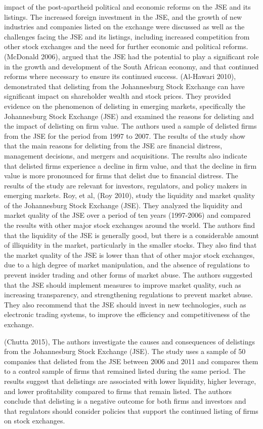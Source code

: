 \documentclass[
]{article}
\begin{document}
impact of the post-apartheid political and economic reforms on the JSE
and its listings. The increased foreign investment in the JSE, and the
growth of new industries and companies listed on the exchange were
discussed as well as the challenges facing the JSE and its listings,
including increased competition from other stock exchanges and the need
for further economic and political reforms. (McDonald 2006), argued that
the JSE had the potential to play a significant role in the growth and
development of the South African economy, and that continued reforms
where necessary to ensure its continued success. (Al-Hawari 2010),
demonstrated that delisting from the Johannesburg Stock Exchange can
have significant impact on shareholder wealth and stock prices. They
provided evidence on the phenomenon of delisting in emerging markets,
specifically the Johannesburg Stock Exchange (JSE) and examined the
reasons for delisting and the impact of delisting on firm value. The
authors used a sample of delisted firms from the JSE for the period from
1997 to 2007. The results of the study show that the main reasons for
delisting from the JSE are financial distress, management decisions, and
mergers and acquisitions. The results also indicate that delisted firms
experience a decline in firm value, and that the decline in firm value
is more pronounced for firms that delist due to financial distress. The
results of the study are relevant for investors, regulators, and policy
makers in emerging markets. Roy, et al, (Roy 2010), study the liquidity
and market quality of the Johannesburg Stock Exchange (JSE). They
analyzed the liquidity and market quality of the JSE over a period of
ten years (1997-2006) and compared the results with other major stock
exchanges around the world. The authors find that the liquidity of the
JSE is generally good, but there is a considerable amount of illiquidity
in the market, particularly in the smaller stocks. They also find that
the market quality of the JSE is lower than that of other major stock
exchanges, due to a high degree of market manipulation, and the absence
of regulations to prevent insider trading and other forms of market
abuse. The authors suggested that the JSE should implement measures to
improve market quality, such as increasing transparency, and
strengthening regulations to prevent market abuse. They also recommend
that the JSE should invest in new technologies, such as electronic
trading systems, to improve the efficiency and competitiveness of the
exchange.

(Chutta 2015), The authors investigate the causes and consequences of
delistings from the Johannesburg Stock Exchange (JSE). The study uses a
sample of 50 companies that delisted from the JSE between 2006 and 2011
and compares them to a control sample of firms that remained listed
during the same period. The results suggest that delistings are
associated with lower liquidity, higher leverage, and lower
profitability compared to firms that remain listed. The authors conclude
that delisting is a negative outcome for both firms and investors and
that regulators should consider policies that support the continued
listing of firms on stock exchanges.
\end{document}
